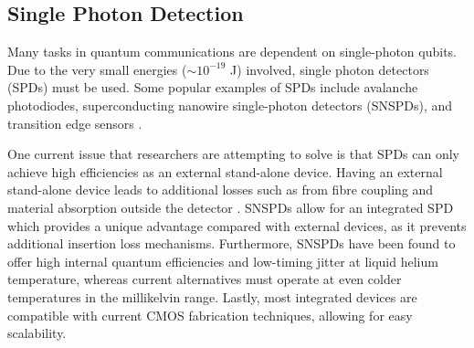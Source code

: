 \documentclass[letterpaper, 10 pt, conference]{ieeeconf}  %
\begin{document}
\subsection{Single Photon Detection}
Many tasks in quantum communications are dependent on single-photon qubits. Due to the very small energies ($\sim 10^{-19}$ J) involved, single photon detectors (SPDs) must be used. Some popular examples of SPDs include avalanche photodiodes, superconducting nanowire single-photon detectors (SNSPDs), and transition edge sensors \cite{bulkoptics}. 

One current issue that researchers are attempting to solve is that SPDs can only achieve high efficiencies as an external stand-alone device. Having an external stand-alone device leads to additional losses such as from fibre coupling and material absorption outside the detector \cite{SNSPD}. SNSPDs allow for an integrated SPD which provides a unique advantage compared with external devices, as it prevents additional insertion loss mechanisms. Furthermore, SNSPDs have been found to offer high internal quantum efficiencies and low-timing jitter at liquid helium temperature, whereas current alternatives must operate at even colder temperatures in the millikelvin range. Lastly, most integrated devices are compatible with current CMOS fabrication techniques, allowing for easy scalability. 

\end{document}
